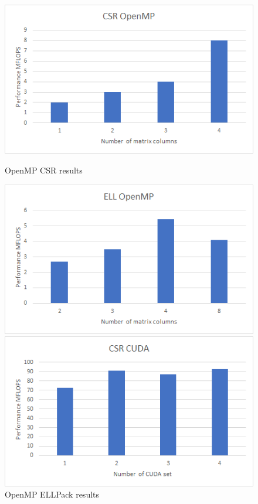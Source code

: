 \documentclass{scrreprt}
\begin{document}
\begin{figure}[ht] 
  \label{ fig7} 
  \begin{minipage}[b]{0.5\linewidth}
    \centering
    \includegraphics[width=.9\linewidth]{rdist2CSRMP.png} 
    \caption{OpenMP CSR results} 
    \vspace{4ex}
  \end{minipage}%
  \begin{minipage}[b]{0.5\linewidth}
    \centering
    \includegraphics[width=.9\linewidth]{rdist2ELLMP.png} 
    \caption{OpenMP ELLPack results} 
    \vspace{4ex}
  \end{minipage} 
  \begin{minipage}[b]{0.5\linewidth}
    \centering
    \includegraphics[width=.9\linewidth]{rdist2CSRCUDA.png} 

\end{minipage}
\end{figure}
\end{document}
